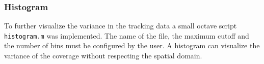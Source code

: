 \documentclass[twoside]{article}
\begin{document}
\subsubsection{Histogram}
To further visualize the variance in the tracking data a small octave script \texttt{histogram.m} was implemented. The name of the file, the maximum cutoff and the number of bins must be configured by the user. A histogram can visualize the variance of the coverage without respecting the spatial domain.


\end{document}
